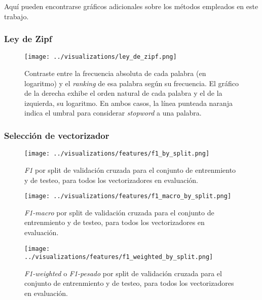 Aquí pueden encontrarse gráficos adicionales sobre los métodos empleados
en este trabajo.

\subsubsection{Ley de Zipf}
\label{appendix-plots-zipf-law}

\begin{figure}[h!]
    \centering
    \texttt{[image: ../visualizations/ley\_de\_zipf.png]}
    \caption{Contraste entre la frecuencia absoluta de cada palabra (en logaritmo)
    y el \textit{ranking} de esa palabra según su frecuencia. El gráfico de la
    derecha exhibe el orden natural de cada palabra y el de la izquierda, su logaritmo.
    En ambos casos, la línea punteada naranja indica el umbral
    para considerar \textit{stopword} a una palabra.}
    \label{fig-zipf-law}
\end{figure}

\subsubsection{Selección de vectorizador}
\label{appendix-plots-vectorizers}

\begin{figure}[h!]
    \centering
    \texttt{[image: ../visualizations/features/f1\_by\_split.png]}
    \caption{\textit{F1} por split de validación cruzada para el conjunto
    de entrenmiento y de testeo, para todos los vectorizadores en evaluación.}
    \label{fig-vectorizers-f1}
\end{figure}

\begin{figure}[h!]
    \centering
    \texttt{[image: ../visualizations/features/f1\_macro\_by\_split.png]}
    \caption{\textit{F1-macro} por split de validación cruzada para el conjunto
    de entrenmiento y de testeo, para todos los vectorizadores en evaluación.}
    \label{fig-vectorizers-f1-macro}
\end{figure}

\begin{figure}[h!]
    \centering
    \texttt{[image: ../visualizations/features/f1\_weighted\_by\_split.png]}
    \caption{\textit{F1-weighted} o \textit{F1-pesado} por split de validación
    cruzada para el conjunto de entrenmiento y de testeo, para todos los
    vectorizadores en evaluación.}
    \label{fig-vectorizers-f1-weighted}
\end{figure}


